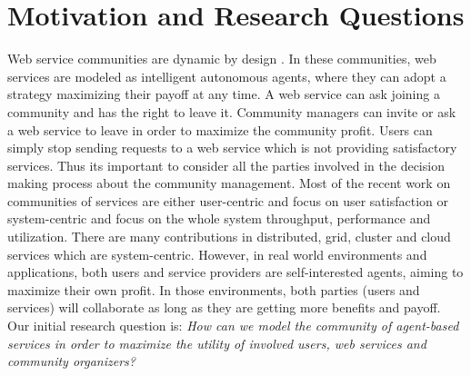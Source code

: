 \section{Motivation and Research Questions}\label{sec:researchquestions}

Web service communities are dynamic by design
\cite{DBLP:journals/ijebr/MaamarSTBB09}. In these communities, web
services are modeled as intelligent autonomous agents, where they
can adopt a strategy maximizing their payoff at any time. A web
service can ask joining a community and has the right to leave it.
Community managers can invite or ask a web service to leave in
order to maximize the community profit. Users can simply stop
sending requests to a web service which is not providing
satisfactory services. Thus its important to consider all the
parties involved in the decision making process about the
community management. Most of the recent work on communities of
services are either user-centric and focus on user satisfaction
\cite{Chun02user-centricperformance} or system-centric and focus
on the whole system throughput, performance and utilization. There
are many contributions in distributed, grid, cluster and cloud
services which are system-centric. However, in real world
environments and applications, both users and service providers
are self-interested agents, aiming to maximize their own profit.
In those environments, both parties (users and services) will
collaborate as long as they are getting more benefits and payoff.
Our initial research question is: \emph{How can we model the
community of agent-based services in order to maximize the utility
of involved users, web services and community organizers?}


